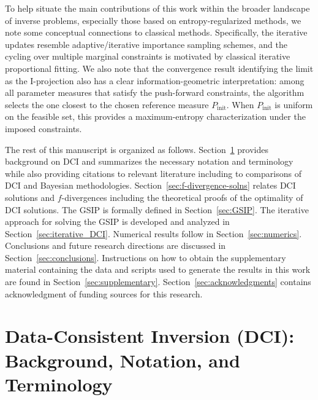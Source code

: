\documentclass{article}
\begin{document}
To help situate the main contributions of this work within the broader landscape of inverse problems, especially those based on entropy-regularized methods, we note some conceptual connections to classical methods.
Specifically, the iterative updates resemble adaptive/iterative importance sampling schemes, and the cycling over multiple marginal constraints is motivated by classical iterative proportional fitting. 
We also note that the convergence result identifying the limit as the I-projection also has a clear information-geometric interpretation: among all parameter measures that satisfy the push-forward constraints, the algorithm selects the one closest to the chosen reference measure $P_\text{init}$. 
When $P_\text{init}$ is uniform on the feasible set, this provides a maximum-entropy characterization under the imposed constraints.

The rest of this manuscript is organized as follows.
Section~\ref{sec:DCI_summary} provides background on DCI and summarizes the necessary notation and terminology while also providing citations to relevant literature including to comparisons of DCI and Bayesian methodologies. 
Section~\ref{sec:f-divergence-solns} relates DCI solutions and $f$-divergences including the theoretical proofs of the optimality of DCI solutions.
The GSIP is formally defined in Section~\ref{sec:GSIP}.
The iterative approach for solving the GSIP is developed and analyzed in Section~\ref{sec:iterative_DCI}.
Numerical results follow in Section~\ref{sec:numerics}.
Conclusions and future research directions are discussed in Section~\ref{sec:conclusions}.
Instructions on how to obtain the supplementary material containing the data and scripts used to generate the results in this work are found in Section~\ref{sec:supplementary}. 
Section~\ref{sec:acknowledgments} contains acknowledgment of funding sources for this research.


\section{Data-Consistent Inversion (DCI): Background, Notation, and Terminology}\label{sec:DCI_summary}

\end{document}
